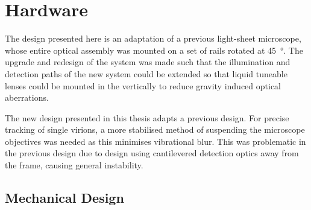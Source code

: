 \section{Hardware}

The design presented here is an adaptation of a previous \gls{light-sheet} microscope, whose entire optical assembly was mounted on a set of rails rotated at \SI{45}{\degree}.
The upgrade and redesign of the system was made such that the illumination and detection paths of the new system could be extended so that liquid tuneable lenses could be mounted in the vertically to reduce gravity induced optical aberrations.

The new design presented in this thesis adapts a previous design.
For precise tracking of single virions, a more stabilised method of suspending the microscope objectives was needed as this minimises vibrational blur.
This was problematic in the previous design due to design using cantilevered detection optics away from the frame, causing general instability.

\subsection{Mechanical Design}


